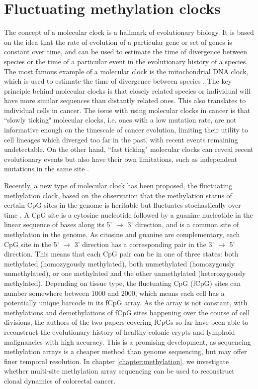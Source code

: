 \section{Fluctuating methylation clocks}
The concept of a molecular clock is a hallmark of evolutionary biology. It is based on the idea that the
rate of evolution of a particular gene or set of genes is constant over time, and can be used to estimate
the time of divergence between species or the time of a particular event in the evolutionary history of a
species. The most famous example of a molecular clock is the mitochondrial DNA clock, which is used to
estimate the time of divergence between species \cite{hasegawa_dating_1985}. The key principle behind molecular
clocks is that closely related species or individual will have more similar sequences than distantly related
ones. This also translates to individual cells in cancer. The issue with using molecular clocks in cancer
is that ``slowly ticking" molecular clocks, i.e. ones with a low mutation rate, are not informative enough
on the timescale of cancer evolution, limiting their utility to cell lineages which diverged too far in the past,
with recent events remaining undetectable. On the other hand, ``fast ticking" molecular clocks can
reveal recent evolutionary events but also have their own limitations, such as independent mutations in the
same site \cite{kuipers_single-cell_2017}. \par
Recently, a new type of molecular clock has been proposed, the fluctuating methylation clock, based on the
observation that the methylation status of certain CpG sites in the genome is heritable but fluctuates
stochastically over time \cite{gabbutt_fluctuating_2022, gabbutt_evolutionary_2023}. A CpG site is a
cytosine nucleotide followed by a guanine nucleotide in the linear sequence of bases along its
5' $\rightarrow$ 3' direction, and is a common site of methylation in the genome. As citosine and guanine
are complementary, each CpG site in the 5' $\rightarrow$ 3' direction has a corresponding pair in the
3' $\rightarrow$ 5' direction. This means that each CpG pair can be in one of three states: both
methylated (homozygously methylated), both unmethylated (homozygously unmethylated), or one methylated
and the other unmethylated (heterozygously methylated). Depending on tissue type, the fluctuating CpG
(fCpG) sites can number somewhere between $1000$ and $2000$, which means each cell has a potentially
unique barcode in its fCpG array. As the array is not constant, with methylations and demethylations
of fCpG sites happening over the course of cell divisions, the authors of the two papers covering fCpGs
so far have been able to reconstruct the evolutionary history of healthy colonic crypts and lymphoid
malignancies with high accuracy. This is a promising development, as sequencing methylation arrays
is a cheaper method than genome sequencing, but may offer finer temporal resolution. In chapter
\ref{chapter:methylation}, we investigate whether multi-site methylation array sequencing can be used
to reconstruct clonal dynamics of colorectal cancer.


